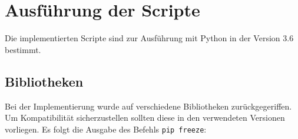 \chapter{Ausführung der Scripte}

Die implementierten Scripte sind zur Ausführung mit Python \cite{Python} in der Version 3.6 bestimmt.

\section{Bibliotheken}

Bei der Implementierung wurde auf verschiedene Bibliotheken zurückgegeriffen. Um Kompatibilität sicherzustellen sollten diese in den verwendeten Versionen vorliegen. Es folgt die Ausgabe des Befehls \verb|pip freeze|:

